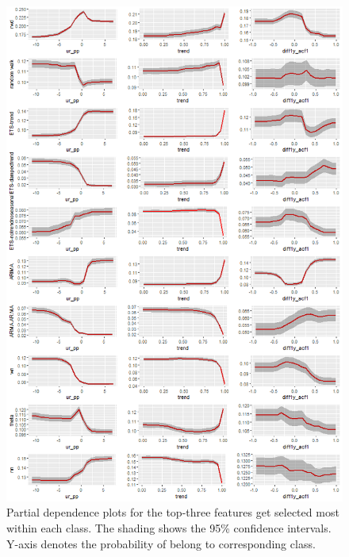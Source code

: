 \documentclass[11pt,a4paper,]{article}
\begin{document}
\begin{figure}
\centering
\includegraphics{figures/pdpyearly-1.png}
\caption{\label{fig:pdpyearly}Partial dependence plots for the top-three
features get selected most within each class. The shading shows the 95\%
confidence intervals. Y-axis denotes the probability of belong to
corresponding class.}
\end{figure}

\newpage
\end{document}
